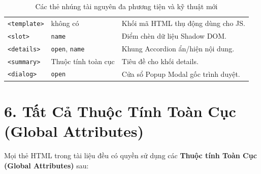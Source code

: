 \documentclass[11pt,oneside]{book}
\newcommand{\codeinline}[1]{\textcolor{accentOrange}{\texttt{#1}}}
\begin{document}
\begin{table}[H]
\begin{prettyTableBox}
\begin{tabularx}{\linewidth}{lp{3.5cm}X}
\codeinline{<template>} & không có & Khối mã HTML thụ động dùng cho JS. \\
\codeinline{<slot>} & \codeinline{name} & Điểm chèn dữ liệu Shadow DOM. \\
\codeinline{<details>} & \codeinline{open}, \codeinline{name} & Khung Accordion ẩn/hiện nội dung. \\
\codeinline{<summary>} & Thuộc tính toàn cục & Tiêu đề cho khối details. \\
\codeinline{<dialog>} & \codeinline{open} & Cửa sổ Popup Modal gốc trình duyệt. \\
\end{tabularx}
\end{prettyTableBox}
\vspace{-2pt}
\caption{Các thẻ nhúng tài nguyên đa phương tiện và kỹ thuật mới}
\end{table}

\section{6. Tất Cả Thuộc Tính Toàn Cục (Global Attributes)}

Mọi thẻ HTML trong tài liệu đều có quyền sử dụng các \textbf{Thuộc tính Toàn Cục (Global Attributes)} sau:
\end{document}
